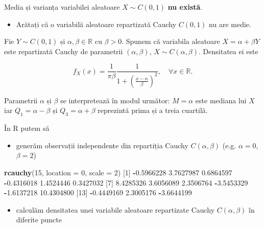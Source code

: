 \documentclass[]{article}
\newenvironment{Shaded}{\begin{snugshade}}{\end{snugshade}}
\newcommand{\KeywordTok}[1]{\textcolor[rgb]{0.13,0.29,0.53}{\textbf{#1}}}
\newcommand{\DataTypeTok}[1]{\textcolor[rgb]{0.13,0.29,0.53}{#1}}
\newcommand{\DecValTok}[1]{\textcolor[rgb]{0.00,0.00,0.81}{#1}}
\newcommand{\FloatTok}[1]{\textcolor[rgb]{0.00,0.00,0.81}{#1}}
\newcommand{\OperatorTok}[1]{\textcolor[rgb]{0.81,0.36,0.00}{\textbf{#1}}}
\newcommand{\NormalTok}[1]{#1}
\providecommand{\tightlist}{%
  \setlength{\itemsep}{0pt}\setlength{\parskip}{0pt}}
\newenvironment{frshaded*}{%
  \def\FrameCommand{\fboxrule=\FrameRule\fboxsep=\FrameSep \fcolorbox{framecolor}{shadecolor1}}%
  \MakeFramed {\advance\hsize-\width \FrameRestore}}%
{\endMakeFramed}
\newenvironment{rmdblock}[1]
  {\begin{frshaded*}
  \begin{itemize}
  \renewcommand{\labelitemi}{
    \raisebox{-.7\height}[0pt][0pt]{
      {\setkeys{Gin}{width=2em,keepaspectratio}\texttt{[image: images/icons/\#1]}}
    }
  }
  \item
  }
  {
  \end{itemize}
  \end{frshaded*}
  }
\newenvironment{rmdexercise}
  {\begin{rmdblock}{exercise}}
  {\end{rmdblock}}
\begin{document}
Media și varianța variabilei aleatoare \(X\sim C(0,1)\) \textbf{nu
există}.

\begin{rmdexercise}
Arătați că o variabilă aleatoare repartizată Cauchy \(C(0,1)\) nu are
medie.
\end{rmdexercise}

Fie \(Y\sim C(0,1)\) și \(\alpha, \beta\in\mathbb{R}\) cu \(\beta>0\).
Spunem că variabila aleatoare \(X = \alpha + \beta Y\) este repartizată
Cauchy de parametrii \((\alpha, \beta)\), \(X\sim C(\alpha, \beta)\).
Densitatea ei este

\[
  f_X(x) = \frac{1}{\pi\beta} \frac{1}{1+\left(\frac{x-\alpha}{\beta}\right)^2},\quad \forall x\in\mathbb{R}.
\]

Parametrii \(\alpha\) și \(\beta\) se interpretează în modul următor:
\(M = \alpha\) este mediana lui \(X\) iar \(Q_1 = \alpha-\beta\) și
\(Q_3 = \alpha + \beta\) reprezintă prima și a treia cuartilă.

În R putem să

\begin{itemize}
\tightlist
\item
  generăm observații independente din repartiția Cauchy
  \(C(\alpha, \beta)\) (e.g. \(\alpha = 0\), \(\beta = 2\))
\end{itemize}

\begin{Shaded}
\begin{Highlighting}[]
\KeywordTok{rcauchy}\NormalTok{(}\DecValTok{15}\NormalTok{, }\DataTypeTok{location =} \DecValTok{0}\NormalTok{, }\DataTypeTok{scale =} \DecValTok{2}\NormalTok{)}
\NormalTok{ [}\DecValTok{1}\NormalTok{] }\OperatorTok{-}\FloatTok{0.5966228}  \FloatTok{3.7627987}  \FloatTok{0.6864597} \OperatorTok{-}\FloatTok{0.4316018}  \FloatTok{1.4524446}  \FloatTok{0.3427032}
\NormalTok{ [}\DecValTok{7}\NormalTok{]  }\FloatTok{8.4285326}  \FloatTok{3.6056089}  \FloatTok{2.3506764} \OperatorTok{-}\FloatTok{3.5453329} \OperatorTok{-}\FloatTok{1.6137218} \FloatTok{10.4304800}
\NormalTok{[}\DecValTok{13}\NormalTok{] }\OperatorTok{-}\FloatTok{0.4449169}  \FloatTok{2.3005176} \OperatorTok{-}\FloatTok{3.6644199}
\end{Highlighting}
\end{Shaded}

\begin{itemize}
\tightlist
\item
  calculăm densitatea unei variabile aleatoare repartizate Cauchy
  \(C(\alpha, \beta)\) în diferite puncte
\end{itemize}
\end{document}
